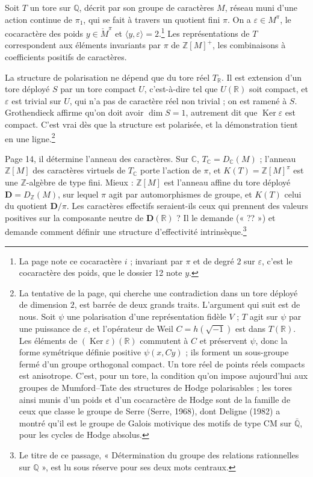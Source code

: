 \documentclass[11pt,a4paper]{article}
\begin{document}
Soit $T$ un tore sur $\mathbb{Q}$, décrit par son groupe de caractères $M$,
réseau muni d'une action continue de $\pi_{1}$, qui se fait à travers un
quotient fini $\pi$. On a $\varepsilon \in M^{\pi}$, le cocaractère des poids
$y \in \check{M}^{\pi}$ et $\langle y, \varepsilon\rangle = 2$.\footnote{La page
note ce cocaractère $i$ ; invariant par $\pi$ et de degré $2$ sur
$\varepsilon$, c'est le cocaractère des poids, que le dossier 12 note $y$.} Les
représentations de $T$ correspondent aux éléments invariants par $\pi$ de
$\mathbb{Z}[M]^{+}$, les combinaisons à coefficients positifs de caractères.

La structure de polarisation ne dépend que du tore réel $T_{\mathbb{R}}$. Il est
extension d'un tore déployé $S$ par un tore compact $U$, c'est-à-dire tel que
$U(\mathbb{R})$ soit compact, et $\varepsilon$ est trivial sur $U$, qui n'a pas
de caractère réel non trivial ; on est ramené à $S$. Grothendieck affirme
qu'on doit avoir $\dim S = 1$, autrement dit que $\operatorname{Ker}
\varepsilon$ est compact. C'est vrai dès que la structure est polarisée, et la
démonstration tient en une ligne.\footnote{La tentative de la page, qui cherche
une contradiction dans un tore déployé de dimension $2$, est barrée de deux
grands traits. L'argument qui suit est de nous. Soit $\psi$ une polarisation d'une
représentation fidèle $V$ ; $T$ agit sur $\psi$ par une puissance de
$\varepsilon$, et l'opérateur de Weil $C = h(\sqrt{-1})$ est dans
$T(\mathbb{R})$. Les éléments de $(\operatorname{Ker}\varepsilon)(\mathbb{R})$
commutent à $C$ et préservent $\psi$, donc la forme symétrique définie positive
$\psi(x, Cy)$ ; ils forment un sous-groupe fermé d'un groupe orthogonal
compact. Un tore réel de points réels compacts est anisotrope. C'est, pour un
tore, la condition qu'on impose aujourd'hui aux groupes de Mumford--Tate des
structures de Hodge polarisables ; les tores ainsi munis d'un poids et d'un
cocaractère de Hodge sont de la famille de ceux que classe le groupe de Serre
(Serre, 1968), dont Deligne (1982) a montré qu'il est le groupe de Galois
motivique des motifs de type CM sur $\bar{\mathbb{Q}}$, pour les cycles de Hodge
absolus.}

Page 14, il détermine l'anneau des caractères. Sur $\mathbb{C}$, $T_{\mathbb{C}}
= D_{\mathbb{C}}(M)$ ; l'anneau $\mathbb{Z}[M]$ des caractères virtuels de
$T_{\mathbb{C}}$ porte l'action de $\pi$, et $K(T) = \mathbb{Z}[M]^{\pi}$ est
une $\mathbb{Z}$-algèbre de type fini. Mieux : $\mathbb{Z}[M]$ est l'anneau
affine du tore déployé $\mathbf{D} = D_{\mathbb{Z}}(M)$, sur lequel $\pi$ agit
par automorphismes de groupe, et $K(T)$ celui du quotient $\mathbf{D}/\pi$.
Les caractères effectifs seraient-ils ceux qui prennent des valeurs positives
sur la composante neutre de $\mathbf{D}(\mathbb{R})$ ? Il le demande (« ?? »)
et demande comment définir une structure d'effectivité intrinsèque.\footnote{Le
titre de ce passage, « Détermination du groupe des relations rationnelles sur
$\mathbb{Q}$ », est lu sous réserve pour ses deux mots centraux.}
\end{document}

